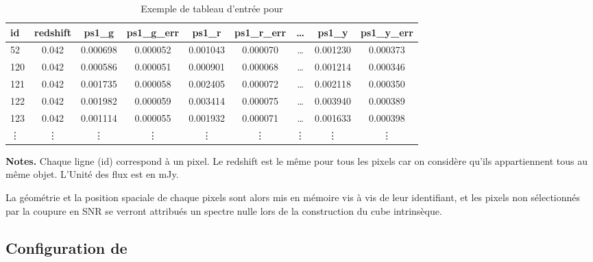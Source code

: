 \documentclass[../main/main.tex]{subfiles}
\begin{document}
\begin{table}[ht]
    \centerfloat
    \begin{threeparttable}
        \caption{Exemple de tableau d'entrée pour }
        \label{tab:cigaleinput}
        
        \begin{tabular}{lcccccccc}
        \toprule
           id &  redshift &     ps1\_g &  ps1\_g\_err &     ps1\_r &  ps1\_r\_err &   \ldots   &     ps1\_y &  ps1\_y\_err \\
        \midrule
           52 &      0.042 &  0.000698 &   0.000052 &  0.001043 &   0.000070 & \ldots &  0.001230 &   0.000373 \\
          120 &      0.042 &  0.000586 &   0.000051 &  0.000901 &   0.000068 &  \ldots &  0.001214 &   0.000346 \\
          121 &      0.042 &  0.001735 &   0.000058 &  0.002405 &   0.000072 &  \ldots &  0.002118 &   0.000350 \\
          122 &      0.042 &  0.001982 &   0.000059 &  0.003414 &   0.000075 & \ldots &  0.003940 &   0.000389 \\
          123 &      0.042 &  0.001114 &   0.000055 &  0.001932 &   0.000071 &  \ldots &  0.001633 &   0.000398 \\
          \vdots & \vdots &\vdots &\vdots &\vdots &\vdots &\vdots &\vdots &\vdots \\
          \bottomrule
        \end{tabular}
        \begin{tablenotes}[flushleft]
        \item \textbf{Notes.} Chaque ligne (id) correspond à un pixel. Le redshift est le même pour tous les
          pixels car on considère qu'ils appartiennent tous au même
          objet. L'Unité des flux est en mJy.
        \end{tablenotes}
    \end{threeparttable}
  \end{table}

La géométrie et la position spaciale de chaque pixels sont alors mis en mémoire vis à vis de leur identifiant, et les pixels non sélectionnés par la coupure en SNR se verront attribués un spectre nulle lors de la construction du cube intrinsèque.

\subsection{Configuration de }
\label{ssec:cigaleconfig}
\end{document}
